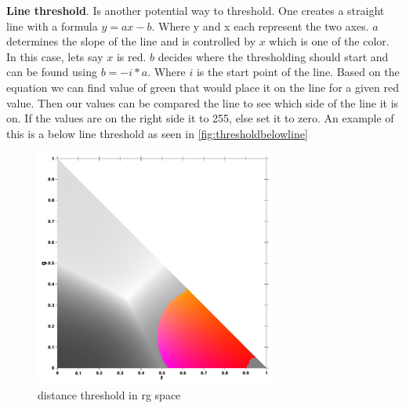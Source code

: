 \textbf{Line threshold}. Is another potential way to threshold. One creates a straight line with a formula $y = ax - b$. Where y and x each represent the two axes. $a$ determines the slope of the line and is controlled by $x$ which is one of the color. In this case, lets say $x$ is red. $b$ decides where the thresholding should start and can be found using $b =- i * a$. Where $i$ is the start point of the line. Based on the equation we can find value of green that would place it on the line for a given red value. Then our values can be compared the line to see which side of the line it is on. If the values are on the right side it to 255, else set it to zero. An example of this is a below line threshold as seen in \autoref{fig:thresholdbelowline}\\
\begin{multicols}{2}
	\begin{figure}[H]
		\centering
		\label{thresholddist}
		\includegraphics[width=1\linewidth]{figure/Analysis/distthresholdcolor.png}
		\caption{distance threshold in rg space}
	\end{figure}
	

\end{multicols}
